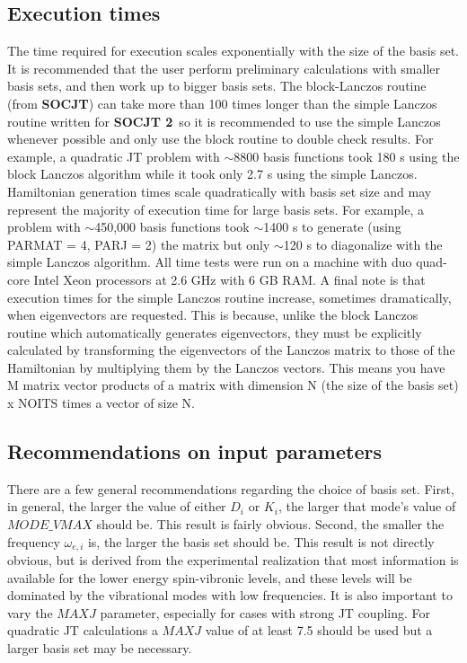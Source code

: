 \documentclass{article}
\newcommand{\socjttwo}{{\bf SOCJT 2}}
\newcommand{\socjt}{{\bf SOCJT}}
\begin{document}
\subsection{Execution times}
The time required for execution scales exponentially with the size of
the basis set. It is recommended that the user perform preliminary
calculations with smaller basis sets, and then work up to bigger basis
sets. The block-Lanczos routine (from \socjt) can take more than 100
times longer than the simple Lanczos routine written for \socjttwo\ so
it is recommended to use the simple Lanczos whenever possible and only
use the block routine to double check results. For example, a quadratic JT problem with $\sim$8800 basis functions took 180 s using the block Lanczos 
algorithm while it took only 2.7 s using the simple Lanczos. Hamiltonian
generation times scale quadratically with basis set size and may represent
the majority of execution time for large basis sets. For example, a problem with $\sim$450,000 basis functions took $\sim$1400 s to generate (using PARMAT = 4, PARJ = 2) the matrix but only $\sim$120 s to diagonalize with the simple Lanczos algorithm. All time tests were run on a machine with duo quad-core Intel Xeon processors at 2.6 GHz with 6 GB RAM. A final note is that execution times for the simple Lanczos routine increase, sometimes dramatically, when eigenvectors are requested. This is because, unlike the block Lanczos routine which automatically generates eigenvectors, they must be explicitly calculated by transforming the eigenvectors of the Lanczos matrix to those of the Hamiltonian by multiplying them by the Lanczos vectors. This means you have M matrix vector products of a matrix with dimension N (the size of the basis set) x NOITS times a vector of size N. 

\subsection{Recommendations on input parameters}
There are a few general recommendations regarding the choice of basis
set. First, in general, the larger the value of either $D_i$ or $K_i$,
the larger that mode's value of $MODE\_VMAX$ should be. This result is
fairly obvious. Second, the smaller the frequency $\omega _{e,i}$ is,
the larger the basis set should be. This result is not directly
obvious, but is derived from the experimental realization that most
information is available for the lower energy spin-vibronic levels,
and these levels will be dominated by the vibrational modes with low
frequencies. It is also important to vary the $MAXJ$ parameter, especially
for cases with strong JT coupling. For quadratic JT calculations a $MAXJ$
value of at least 7.5 should be used but a larger basis set may
be necessary.
\end{document}

